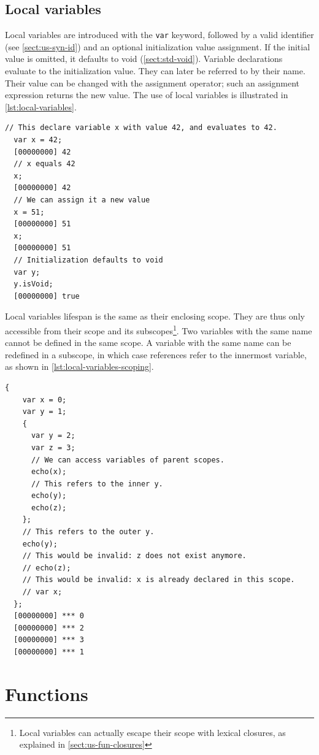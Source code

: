 \documentclass[openright,twoside,12pt]{report}
\newcommand   {\floatpos}          {htbp}
\newcommand{\lst}[1]{\autoref{lst:#1}}
\newcommand{\sect}[1]{\autoref{sect:#1}}
\begin{document}
\subsection{Local variables}

Local variables are introduced with the \lstinline|var| keyword,
followed by a valid identifier (see \sect{us-syn-id}) and an optional
initialization value assignment. If the initial value is omitted, it
defaults to void (\sect{std-void}). Variable declarations evaluate to
the initialization value. They can later be referred to by their
name. Their value can be changed with the assignment operator; such an
assignment expression returns the new value. The use of local
variables is illustrated in \lst{local-variables}.

\begin{lstlisting}[caption=Using local variables,
  label=lst:local-variables,float=\floatpos]
  // This declare variable x with value 42, and evaluates to 42.
  var x = 42;
  [00000000] 42
  // x equals 42
  x;
  [00000000] 42
  // We can assign it a new value
  x = 51;
  [00000000] 51
  x;
  [00000000] 51
  // Initialization defaults to void
  var y;
  y.isVoid;
  [00000000] true
\end{lstlisting}

Local variables lifespan is the same as their enclosing scope. They
are thus only accessible from their scope and its
subscopes\footnote{Local variables can actually escape their scope
  with lexical closures, as explained in \sect{us-fun-closures}}. Two
variables with the same name cannot be defined in the same scope. A
variable with the same name can be redefined in a subscope, in which
case references refer to the innermost variable, as shown in
\lst{local-variables-scoping}.

\begin{lstlisting}[caption=Local variables scoping,
  label=lst:local-variables-scoping,float=\floatpos]
  {
    var x = 0;
    var y = 1;
    {
      var y = 2;
      var z = 3;
      // We can access variables of parent scopes.
      echo(x);
      // This refers to the inner y.
      echo(y);
      echo(z);
    };
    // This refers to the outer y.
    echo(y);
    // This would be invalid: z does not exist anymore.
    // echo(z);
    // This would be invalid: x is already declared in this scope.
    // var x;
  };
  [00000000] *** 0
  [00000000] *** 2
  [00000000] *** 3
  [00000000] *** 1
\end{lstlisting}

\section{Functions}
\end{document}
